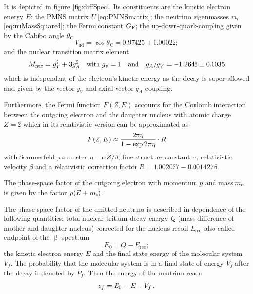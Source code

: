 It is depicted in figure \ref{fig:diffSpec}. Its constituents are the kinetic electron energy $E$;
the PMNS matrix $U$ \eqref{eq:PMNSmatrix}; the neutrino eigenmasses $m_i$ \eqref{eq:nuMassSquared};
the Fermi constant $G_\mathrm{F}$;
the up-down-quark-coupling given by the Cabibo angle $\theta_\mathrm{C}$
\begin{equation}
    V_\mathrm{ud} = \cos \theta_\mathrm{C} = 
    0.97425\pm0.00022;
\end{equation}
and the nuclear transition matrix element
\begin{equation}
    M_\mathrm{nuc} = g_V^2+3g_A^2 \quad
    \text{with } g_v = 1 \quad
    \text{and} \quad g_A/g_V = -1.2646 \pm 0.0035
\end{equation}
which is independent of the electron's kinetic energy as the decay is super-allowed and given by the vector $g_V$ and axial vector $g_A$ coupling.

Furthermore, the Fermi function $F(Z,E)$ accounts for the Coulomb interaction between the outgoing electron and the daughter nucleus with atomic charge $Z=2$ which in its relativistic version can be approximated as
\begin{equation}
    F(Z,E) \approx \frac{2 \pi \eta}{1-\exp{2 \pi \eta}} \cdot R \\
\end{equation}
with Sommerfeld parameter $\eta = \alpha Z / \beta$, fine structure constant $\alpha$, relativistic velocity $\beta$ and a relativistic correction factor $R = 1.002037-0.001427\beta$.

The phase-space factor of the outgoing electron with momentum $p$ and mass $m_{\mathrm{e}}$ is given by the factor $p(E+m_{\mathrm{e}})$.

The phase space factor of the emitted neutrino is described in dependence of the following quantities: total nuclear tritium decay energy $Q$ (mass difference of mother and daughter nucleus) corrected for the nucleus recoil $E_\mathrm{rec}$ also called endpoint of the $\upbeta$ spectrum
\begin{equation}
    \label{eq:endpoint}
    E_0 = Q-E_\mathrm{rec};
\end{equation}
the kinetic electron energy $E$ and the final state energy of the molecular system $V_f$. The probability that the molecular system is in a final state of energy $V_f$ after the decay is denoted by $P_f$. Then the energy of the neutrino reads 
\begin{equation}
    \epsilon_f = E_0 - E - V_f \text{\,.}
\end{equation}

